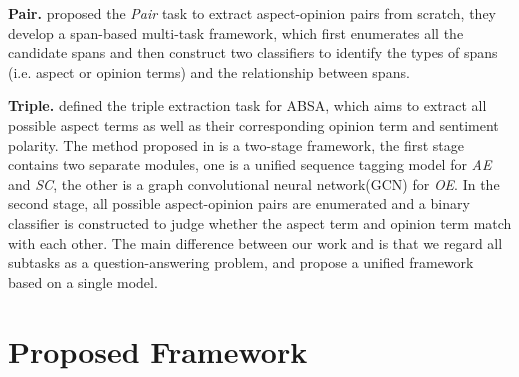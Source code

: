 \documentclass[letterpaper]{article} \usepackage{aaai21}  \usepackage{times}  \usepackage{helvet} \usepackage{courier}  \usepackage[hyphens]{url}  \usepackage{graphicx} \urlstyle{rm} \def\UrlFont{\rm}  \usepackage{natbib}  \usepackage{caption}
\begin{document}
\textbf{Pair.}  \citet{ZhaoHZLX20} proposed the \emph{Pair} task to extract aspect-opinion pairs from scratch, they develop a span-based multi-task framework, 
which first enumerates all the candidate spans and then construct two classifiers to identify the types of spans (i.e. aspect or opinion terms) and the relationship between spans.  	

\textbf{Triple.}  \citet{peng2020knowing} defined the triple extraction task for ABSA, which aims to extract all possible aspect terms as well as their corresponding opinion term and sentiment polarity.  
The method proposed in  \cite{peng2020knowing} is a two-stage framework, the first stage contains two separate modules, one is a unified sequence tagging model for \emph{AE} and \emph{SC}, the other is a graph convolutional neural network(GCN) for \emph{OE}. 
In the second stage, all possible aspect-opinion pairs are enumerated and a binary classifier is constructed to judge whether the aspect term and opinion term match with each other.  
The main difference between our work and  \cite{peng2020knowing} is that we regard all subtasks as a question-answering problem, and propose a unified framework based on a single model. 




\section{Proposed Framework}
\end{document}
